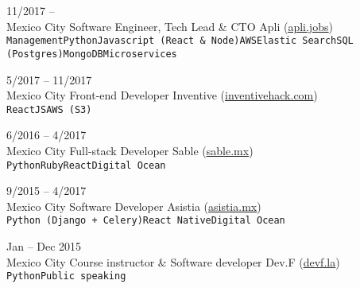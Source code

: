 \documentclass[9pt]{developercv} %
\begin{document}
\begin{entrylist}
    \entry
        {
            11/2017 --
            \\\footnotesize{Mexico City}
        }
        {Software Engineer, Tech Lead \& CTO}
        {Apli ({\href{https://apli.jobs/}{\underline{apli.jobs}}})}
        {\lorem \lorem\\ \texttt{Management}\slashsep\texttt{Python}\slashsep\texttt{Javascript (React \& Node)}\slashsep\texttt{AWS}\slashsep\texttt{Elastic Search}\slashsep\texttt{SQL (Postgres)}\slashsep\texttt{MongoDB}\slashsep\texttt{Microservices}}

    \entry
        {
            5/2017 -- 11/2017
            \\\footnotesize{Mexico City}
        }
        {Front-end Developer}
        {Inventive ({\href{https://www.linkedin.com/company/inventivehack/}{\underline{inventivehack.com}}})}
        {\lorem \lorem\\ \texttt{ReactJS}\slashsep\texttt{AWS (S3)}}

    \entry
        {
            6/2016 -- 4/2017
            \\\footnotesize{Mexico City}
        }
        {Full-stack Developer}
        {Sable ({\href{https://sable.mx/}{\underline{sable.mx}}})}
        {\lorem \lorem \lorem\\ \texttt{Python}\slashsep\texttt{Ruby}\slashsep\texttt{React}\slashsep\texttt{Digital Ocean}}

    \entry
        {
            9/2015 -- 4/2017
            \\\footnotesize{Mexico City}
        }
        {Software Developer}
        {Asistia ({\href{https://www.linkedin.com/company/asistia/}{\underline{asistia.mx}}})}
        {\lorem \lorem \lorem\\ \texttt{Python (Django + Celery)}\slashsep\texttt{React Native}\slashsep\texttt{Digital Ocean}}

    \entry
        {
            Jan -- Dec 2015
            \\\footnotesize{Mexico City}
        }
        {Course instructor \& Software developer}
        {Dev.F ({\href{https://devf.la/}{\underline{devf.la}}})}
        {\lorem \lorem \lorem\\ \texttt{Python}\slashsep\texttt{Public speaking}}


\end{entrylist}
\end{document}
